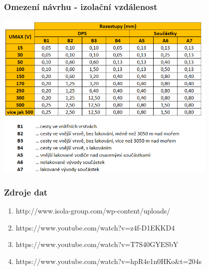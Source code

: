 \documentclass{beamer}
\begin{document}
\begin{frame}
	\frametitle{Omezení návrhu - izolační vzdálenost}
	
	\begin{center}
		\includegraphics[width=0.8\textwidth]{spacing.png}
	\end{center}
	
\end{frame}
\begin{frame}
	\frametitle{Zdroje dat}

	\begin{enumerate}
		\item http://www.isola-group.com/wp-content/uploads/
		\item https://www.youtube.com/watch?v=z4f-D1EKKD4
		\item https://www.youtube.com/watch?v=T7S40GYESbY
		\item https://www.youtube.com/watch?v=hpR4e1n0HKo\&t=204s
	\end{enumerate}
\end{frame}
\end{document}
